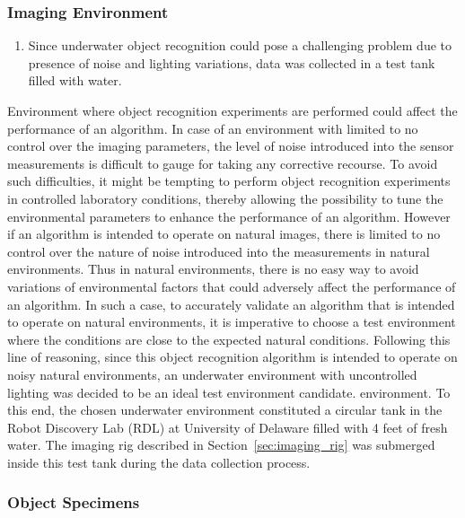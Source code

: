 \documentclass {udthesis}
\begin{document}
\subsubsection{Imaging Environment}


\begin{enumerate}
	\item Since underwater object recognition could pose a challenging problem due to presence of noise and lighting variations, data was collected in a test tank filled with water.
\end{enumerate}


Environment where object recognition experiments are performed could affect the performance of an algorithm. In case of an environment with limited to no control over the imaging parameters, the level of noise introduced into the sensor measurements is difficult to gauge for taking any corrective recourse. To avoid such difficulties, it might be tempting to perform object recognition experiments in controlled laboratory conditions, thereby allowing the possibility to tune the environmental parameters to enhance the performance of an algorithm. However if an algorithm is intended to operate on natural images, there is limited to no control over the nature of noise introduced into the measurements in natural environments. Thus in natural environments, there is no easy way to avoid variations of environmental factors that could adversely affect the performance of an algorithm. In such a case, to accurately validate an algorithm that is intended to operate on natural environments, it is imperative to choose a test environment where the conditions are close to the expected natural conditions. Following this line of reasoning, since this object recognition algorithm is intended to operate on noisy natural environments, an underwater environment with uncontrolled lighting was decided to be an ideal test environment candidate. 
environment. To this end, the chosen underwater environment constituted a circular tank in the Robot Discovery Lab (RDL) at University of Delaware filled with 4 feet of fresh water. The imaging rig described in Section~\ref{sec:imaging_rig} was submerged inside this test tank during the data collection process.

\subsubsection{Object Specimens}
\end{document}
